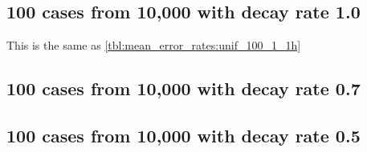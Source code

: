 \subsection{100 cases from 10,000 with decay rate 1.0}

This is the same as \cref{tbl:mean_error_rates:unif_100_1_1h}
\begin{table}[H]
\centering
\scriptsize

    \begin{subtable}{0.5\textwidth}
    
    \caption{Means} 
    \end{subtable}%
    \begin{subtable}{0.5\textwidth}
    
    \caption{Standard deviations} 
    \end{subtable}

\caption{Error rates for uniform population of 10,000, single peak intensity of factor 100 and population decay rate 1.0}
\label{tbl:mean_error_rates:unif_100_1_1h:3}
\end{table}

\subsection{100 cases from 10,000 with decay rate 0.7}
\begin{table}[H]
\centering
\scriptsize

    \begin{subtable}{0.5\textwidth}
    
    \caption{Means} 
    \end{subtable}%
    \begin{subtable}{0.5\textwidth}
    
    \caption{Standard deviations} 
    \end{subtable}

\caption{Error rates for uniform population of 10,000, single peak intensity of factor 100 and decay rate 0.7}
\label{tbl:mean_error_rates:unif_100_0.7_1h}
\end{table}

\subsection{100 cases from 10,000 with decay rate 0.5}
\begin{table}[H]
\centering
\scriptsize

    \begin{subtable}{0.5\textwidth}
    
    \caption{Means} 
    \end{subtable}%
    \begin{subtable}{0.5\textwidth}
    
    \caption{Standard deviations} 
    \end{subtable}

\caption{Error rates for uniform population of 10,000, single peak intensity of factor 100 and decay rate 0.5}
\label{tbl:mean_error_rates:unif_100_0.5_1h}
\end{table}



